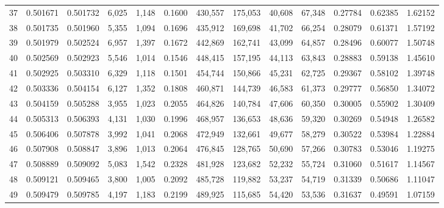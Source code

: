 \begin{tabular}{rrrrrrrrrrrrr}
37 &  0.501671 &  0.501732 &   6,025 &  1,148 &                                     0.1600 &  430,557 &  175,053 &   40,608 &   67,348 &  0.27784 &  0.62385 &  1.62152 \\
38 &  0.501735 &  0.501960 &   5,355 &  1,094 &                                     0.1696 &  435,912 &  169,698 &   41,702 &   66,254 &  0.28079 &  0.61371 &  1.57192 \\
39 &  0.501979 &  0.502524 &   6,957 &  1,397 &                                     0.1672 &  442,869 &  162,741 &   43,099 &   64,857 &  0.28496 &  0.60077 &  1.50748 \\
40 &  0.502569 &  0.502923 &   5,546 &  1,014 &                                     0.1546 &  448,415 &  157,195 &   44,113 &   63,843 &  0.28883 &  0.59138 &  1.45610 \\
41 &  0.502925 &  0.503310 &   6,329 &  1,118 &                                     0.1501 &  454,744 &  150,866 &   45,231 &   62,725 &  0.29367 &  0.58102 &  1.39748 \\
42 &  0.503336 &  0.504154 &   6,127 &  1,352 &                                     0.1808 &  460,871 &  144,739 &   46,583 &   61,373 &  0.29777 &  0.56850 &  1.34072 \\
43 &  0.504159 &  0.505288 &   3,955 &  1,023 &                                     0.2055 &  464,826 &  140,784 &   47,606 &   60,350 &  0.30005 &  0.55902 &  1.30409 \\
44 &  0.505313 &  0.506393 &   4,131 &  1,030 &                                     0.1996 &  468,957 &  136,653 &   48,636 &   59,320 &  0.30269 &  0.54948 &  1.26582 \\
45 &  0.506406 &  0.507878 &   3,992 &  1,041 &                                     0.2068 &  472,949 &  132,661 &   49,677 &   58,279 &  0.30522 &  0.53984 &  1.22884 \\
46 &  0.507908 &  0.508847 &   3,896 &  1,013 &                                     0.2064 &  476,845 &  128,765 &   50,690 &   57,266 &  0.30783 &  0.53046 &  1.19275 \\
47 &  0.508889 &  0.509092 &   5,083 &  1,542 &                                     0.2328 &  481,928 &  123,682 &   52,232 &   55,724 &  0.31060 &  0.51617 &  1.14567 \\
48 &  0.509121 &  0.509465 &   3,800 &  1,005 &                                     0.2092 &  485,728 &  119,882 &   53,237 &   54,719 &  0.31339 &  0.50686 &  1.11047 \\
49 &  0.509479 &  0.509785 &   4,197 &  1,183 &                                     0.2199 &  489,925 &  115,685 &   54,420 &   53,536 &  0.31637 &  0.49591 &  1.07159 \\

\end{tabular}
